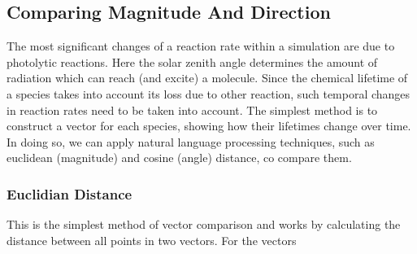 


  \subsection{Comparing Magnitude And Direction}
The most significant changes of a reaction rate within a simulation are due to photolytic reactions. Here the solar zenith angle determines the amount of radiation which can reach (and excite) a molecule. Since the chemical lifetime of a species takes into account its loss due to other reaction, such temporal changes in reaction rates need to be taken into account. The simplest method is to construct a vector for each species, showing how their lifetimes change over time. In doing so, we can apply natural language processing techniques, such as euclidean (magnitude) and cosine (angle) distance, co compare them.

  \subsubsection{Euclidian Distance} \label{sec:euclid}
  This is the simplest method of vector comparison and works by calculating the distance between all points in two vectors. For the vectors

